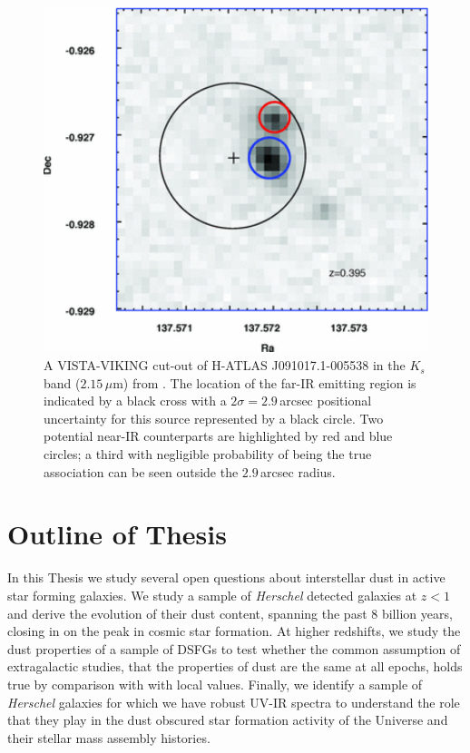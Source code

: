 \begin{figure}
    \centering
	\includegraphics[width=0.75\columnwidth]{Figures/viking_cutout.pdf}
	\caption[VISTA-VIKING cut-out of H-ATLAS J091017.1-005538]{A VISTA-VIKING cut-out of H-ATLAS J091017.1-005538 in the $K_s$ band ($2.15\,\mu$m) from \citealt{Fleuren_2012}. The location of the far-IR emitting region is indicated by a black cross with a $2\sigma = 2.9\,$arcsec positional uncertainty for this source represented by a black circle. Two potential near-IR counterparts are highlighted by red and blue circles; a third with negligible probability of being the true association can be seen outside the $2.9\,$arcsec radius.}
	\label{fig:viking_cutout}
\end{figure}

\section{Outline of Thesis}

In this Thesis we study several open questions about interstellar dust in active star forming galaxies. We study a sample of \textit{Herschel} detected galaxies at $z < 1$ and derive the evolution of their dust content, spanning the past $8$ billion years, closing in on the peak in cosmic star formation. At higher redshifts, we study the dust properties of a sample of DSFGs to test whether the common assumption of extragalactic studies, that the properties of dust are the same at all epochs, holds true by comparison with with local values. Finally, we identify a sample of \textit{Herschel} galaxies for which we have robust UV-IR spectra to understand the role that they play in the dust obscured star formation activity of the Universe and their stellar mass assembly histories.

